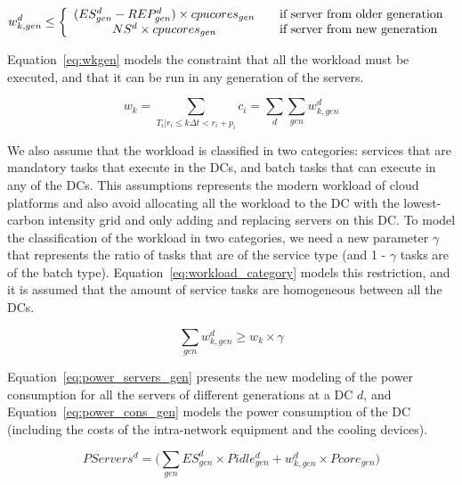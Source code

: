 \begin{equation} \label{eq:workload_gen}
w_{k,gen}^d \leq   \left\{ 
  \begin{array}{ c l }
    (ES_{gen}^d - REP_{gen}^d) \times cpucores_{gen}  & \quad \textrm{if server from older generation  }     \\
     NS^d \times cpucores_{gen}   & \quad \textrm{if server from new generation  }      \\
    
  \end{array}
\right.
\end{equation}

Equation~\eqref{eq:wkgen} models the constraint that all the workload must be executed, and that it can be run in any generation of the servers.

\begin{equation} \label{eq:wkgen}
    w_k = \sum_{T_i|r_i\leq k\Delta t<r_i+p_i} c_i = \sum_d \sum_{gen} w_{k,gen}^d
\end{equation}

We also assume that the workload is classified in two categories: services that are mandatory tasks that execute in the DCs, and batch tasks that can execute in any of the DCs. This assumptions represents the modern workload of cloud platforms and also avoid allocating all the workload to the DC with the lowest-carbon intensity grid and only adding and replacing servers on this DC. To model the classification of the workload in two categories, we need a new parameter $\gamma$ that represents the ratio of tasks that are of the service type (and 1 - $\gamma$ tasks are of the batch type). Equation~\eqref{eq:workload_category} models this restriction, and it is assumed that the amount of service tasks are homogeneous between all the DCs.

\begin{equation} \label{eq:workload_category}
 \sum_{gen}  w_{k,gen}^d \geq  w_k \times \gamma
\end{equation}


Equation~\eqref{eq:power_servers_gen} presents the new modeling of the power consumption for all the servers of different generations at a DC $d$, and Equation~\eqref{eq:power_cons_gen} models the power consumption of the DC (including the costs of the intra-network equipment and the cooling devices).


\begin{equation} \label{eq:power_servers_gen}
   PServers^d  =  \big(   \sum_{gen} ES_{gen}^d \times  Pidle_{gen}^d + w^d_{k,gen}  \times  Pcore_{gen} \big)
\end{equation}


